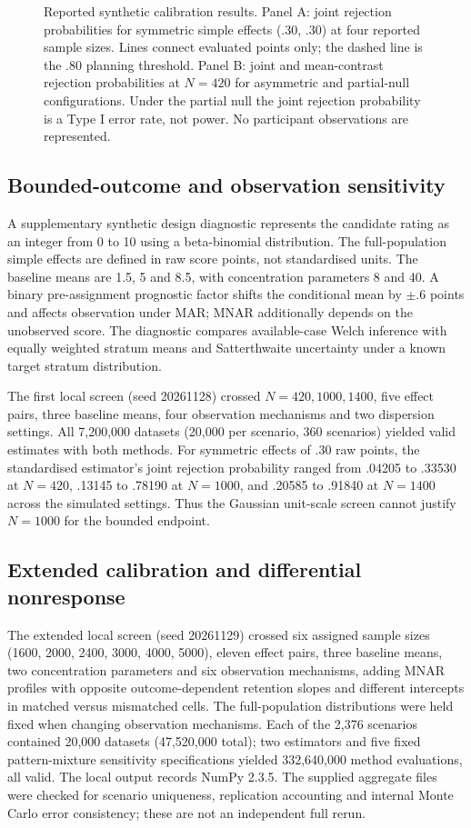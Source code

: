 \begin{figure}[htbp]
\centering

\caption{Reported synthetic calibration results. Panel A: joint rejection probabilities for symmetric simple effects (.30, .30) at four reported sample sizes. Lines connect evaluated points only; the dashed line is the .80 planning threshold. Panel B: joint and mean-contrast rejection probabilities at $N=420$ for asymmetric and partial-null configurations. Under the partial null the joint rejection probability is a Type I error rate, not power. No participant observations are represented.}
\label{fig:cp-power}
\end{figure}

\subsection{Bounded-outcome and observation sensitivity}
A supplementary synthetic design diagnostic represents the candidate rating as an integer from 0 to 10 using a beta-binomial distribution. The full-population simple effects are defined in raw score points, not standardised units. The baseline means are 1.5, 5 and 8.5, with concentration parameters 8 and 40. A binary pre-assignment prognostic factor shifts the conditional mean by $\pm .6$ points and affects observation under MAR; MNAR additionally depends on the unobserved score. The diagnostic compares available-case Welch inference with equally weighted stratum means and Satterthwaite uncertainty under a known target stratum distribution.

The first local screen (seed 20261128) crossed $N=420,1000,1400$, five effect pairs, three baseline means, four observation mechanisms and two dispersion settings. All 7,200,000 datasets (20,000 per scenario, 360 scenarios) yielded valid estimates with both methods. For symmetric effects of .30 raw points, the standardised estimator's joint rejection probability ranged from .04205 to .33530 at $N=420$, .13145 to .78190 at $N=1000$, and .20585 to .91840 at $N=1400$ across the simulated settings. Thus the Gaussian unit-scale screen cannot justify $N=1000$ for the bounded endpoint.

\subsection{Extended calibration and differential nonresponse}
The extended local screen (seed 20261129) crossed six assigned sample sizes (1600, 2000, 2400, 3000, 4000, 5000), eleven effect pairs, three baseline means, two concentration parameters and six observation mechanisms, adding MNAR profiles with opposite outcome-dependent retention slopes and different intercepts in matched versus mismatched cells. The full-population distributions were held fixed when changing observation mechanisms. Each of the 2,376 scenarios contained 20,000 datasets (47,520,000 total); two estimators and five fixed pattern-mixture sensitivity specifications yielded 332,640,000 method evaluations, all valid. The local output records NumPy 2.3.5. The supplied aggregate files were checked for scenario uniqueness, replication accounting and internal Monte Carlo error consistency; these are not an independent full rerun.

